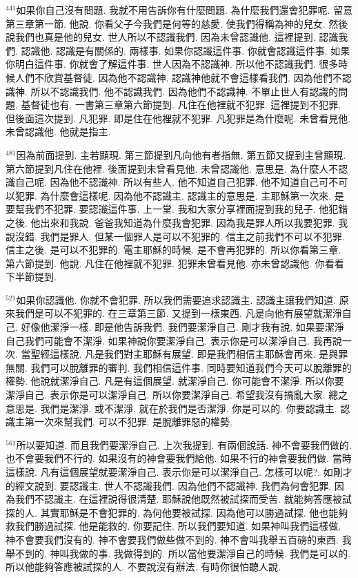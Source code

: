 \documentclass{book}
\begin{document}
$^{441}$如果你自己沒有問題.
我就不用告訴你有什麼問題.
為什麼我們還會犯罪呢.
留意第三章第一節.
他說.
你看父子今我們是何等的慈愛.
使我們得稱為神的兒女.
然後說我們也真是他的兒女.
世人所以不認識我們.
因為未曾認識他.
這裡提到.
認識我們.
認識他.
認識是有關係的.
兩樣事.
如果你認識這件事.
你就會認識這件事.
如果你明白這件事.
你就會了解這件事.
世人因為不認識神.
所以他不認識我們.
很多時候人們不欣賞基督徒.
因為他不認識神.
認識神他就不會這樣看我們.
因為他們不認識神.
所以不認識我們.
他不認識我們.
因為他們不認識神.
不單止世人有認識的問題.
基督徒也有.
一書第三章第六節提到.
凡住在他裡就不犯罪.
這裡提到不犯罪.
但後面這次提到.
凡犯罪.
即是住在他裡就不犯罪.
凡犯罪是為什麼呢.
未曾看見他.
未曾認識他.
他就是指主.

$^{481}$因為前面提到.
主若顯現.
第三節提到凡向他有者指無.
第五節又提到主曾顯現.
第六節提到凡住在他裡.
後面提到未曾看見他.
未曾認識他.
意思是.
為什麼人不認識自己呢.
因為他不認識神.
所以有些人.
他不知道自己犯罪.
他不知道自己可不可以犯罪.
為什麼會這樣呢.
因為他不認識主.
認識主的意思是.
主耶穌第一次來.
是要幫我們不犯罪.
要認識這件事.
上一堂.
我和大家分享裡面提到我的兒子.
他犯錯之後.
他出來和我說.
爸爸我知道為什麼我會犯罪.
因為我是罪人所以我要犯罪.
我說沒錯.
我們是罪人.
但某一個罪人是可以不犯罪的.
信主之前我們不可以不犯罪.
信主之後.
是可以不犯罪的.
電主耶穌的時候.
是不會再犯罪的.
所以你看第三章.
第六節提到.
他說.
凡住在他裡就不犯罪.
犯罪未曾看見他.
亦未曾認識他.
你看看下半節提到.

$^{521}$如果你認識他.
你就不會犯罪.
所以我們需要追求認識主.
認識主讓我們知道.
原來我們是可以不犯罪的.
在三章第三節.
又提到一樣東西.
凡是向他有展望就潔淨自己.
好像他潔淨一樣.
即是他告訴我們.
我們要潔淨自己.
剛才我有說.
如果要潔淨自己我們可能會不潔淨.
如果神說你要潔淨自己.
表示你是可以潔淨自己.
我再說一次.
當聖經這樣說.
凡是我們對主耶穌有展望.
即是我們相信主耶穌會再來.
是與罪無關.
我們可以脫離罪的審判.
我們相信這件事.
同時要知道我們今天可以脫離罪的權勢.
他說就潔淨自己.
凡是有這個展望.
就潔淨自己.
你可能會不潔淨.
所以你要潔淨自己.
表示你是可以潔淨自己.
所以你要潔淨自己.
希望我沒有搞亂大家.
總之意思是.
我們是潔淨.
或不潔淨.
就在於我們是否潔淨.
你是可以的.
你要認識主.
認識主第一次來幫我們.
可以不犯罪.
是脫離罪惡的權勢.

$^{561}$所以要知道.
而且我們要潔淨自己.
上次我提到.
有兩個說話.
神不會要我們做的.
也不會要我們不行的.
如果沒有的神會要我們給他.
如果不行的神會要我們做.
當時這樣說.
凡有這個展望就要潔淨自己.
表示你是可以潔淨自己.
怎樣可以呢?.
如剛才的經文說到.
要認識主.
世人不認識我們.
因為他們不認識神.
我們為何會犯罪.
因為我們不認識主.
在這裡說得很清楚.
耶穌說他既然被試探而受苦.
就能夠答應被試探的人.
其實耶穌是不會犯罪的.
為何他要被試探.
因為他可以勝過試探.
他也能夠救我們勝過試探.
他是能救的.
你要記住.
所以我們要知道.
如果神叫我們這樣做.
神不會要我們沒有的.
神不會要我們做些做不到的.
神不會叫我舉五百磅的東西.
我舉不到的.
神叫我做的事.
我做得到的.
所以當他要潔淨自己的時候.
我們是可以的.
所以他能夠答應被試探的人.
不要說沒有辦法.
有時你很怕聽人說.
\end{document}
